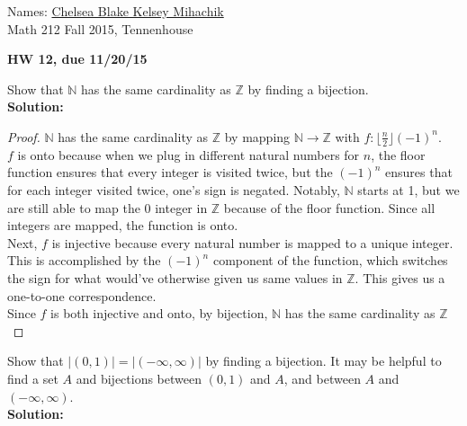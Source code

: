 \documentclass[12pt,letterpaper]{exam}
\begin{document}
\setlength{\pdfpageheight}{\paperheight}
\setlength{\pdfpagewidth}{\paperwidth}

\newcommand{\ud}{\,\mathrm{d}}
\pointsinmargin

Names: \underline{Chelsea Blake Kelsey Mihachik \hspace{4in}}\\
Math 212 Fall 2015, Tennenhouse \\


\begin{center}
\textbf{HW 12, due 11/20/15}\\
\end{center}


\begin{questions}


\question[15,5]
Show that $\mathbb{N}$ has the same cardinality as $\mathbb{Z}$ by finding a bijection.\\
\textbf{Solution:}\\
\begin{proof}
$\mathbb{N}$ has the same cardinality as $\mathbb{Z}$ by mapping $\mathbb{N} \rightarrow \mathbb{Z}$ with $f: \lfloor \frac{n}{2} \rfloor (-1)^n$.\\

$f$ is onto because when we plug in different natural numbers for $n$, the floor function ensures that every integer is visited twice, but the $(-1)^n$ ensures that for each integer visited twice, one's sign is negated. Notably, $\mathbb{N}$ starts at 1, but we are still able to map the 0 integer in $\mathbb{Z}$ because of the floor function. Since all integers are mapped, the function is onto.\\

Next, $f$ is injective because every natural number is mapped to a unique integer. This is accomplished by the $(-1)^n$ component of the function, which switches the sign for what would've otherwise given us same values in $\mathbb{Z}$. This gives us a one-to-one correspondence.\\

Since $f$ is both injective and onto, by bijection, $\mathbb{N}$ has the same cardinality as $\mathbb{Z}$

\end{proof}

\question
Show that $|(0,1)|=|(-\infty,\infty)|$ by finding a bijection. It may be helpful to find a set $A$ and bijections between $(0,1)$ and $A$, and between $A$ and $(-\infty,\infty)$.
\\
\textbf{Solution:}



\end{questions}
\end{document}
